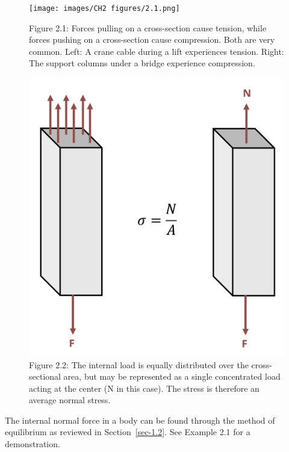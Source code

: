 \documentclass[
  letterpaper,
  DIV=11,
  numbers=noendperiod]{scrreprt}
\begin{document}
\begin{figure}[H]

{\centering \texttt{[image: images/CH2 figures/2.1.png]}

}

\caption{Figure 2.1: Forces pulling on a cross-section cause tension,
while forces pushing on a cross-section cause compression. Both are very
common. Left: A crane cable during a lift experiences tension. Right:
The support columns under a bridge experience compression.}

\end{figure}%
\begin{figure}[H]

{\centering \includegraphics{images/CH2 figures/2.2.png}

}

\caption{Figure 2.2: The internal load is equally distributed over the
cross-sectional area, but may be represented as a single concentrated
load acting at the center (N in this case). The stress is therefore an
average normal stress.}

\end{figure}%

The internal normal force in a body can be found through the method of
equilibrium as reviewed in Section~\ref{sec-1.2}. See Example 2.1 for a
demonstration.
\end{document}
